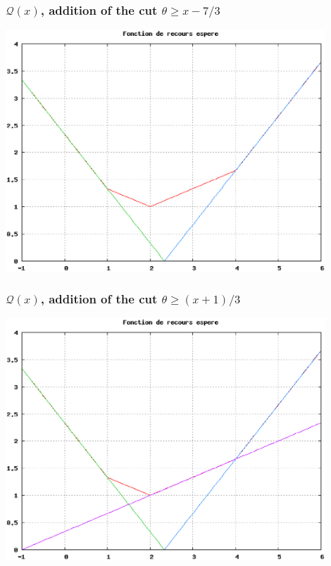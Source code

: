 \documentclass{beamer}
\begin{document}
\begin{frame}
	\frametitle{$\mathcal{Q}(x)$, addition of the cut $\theta \geq x-7/3$}
	
	\includegraphics[width=0.9\textwidth]{coupe_2.eps}
	
\end{frame}

\begin{frame}
	\frametitle{$\mathcal{Q}(x)$, addition of the cut $\theta \geq (x+1)/3$}
	
	\includegraphics[width=0.9\textwidth]{coupe_3.eps}
	
\end{frame}
\end{document}
